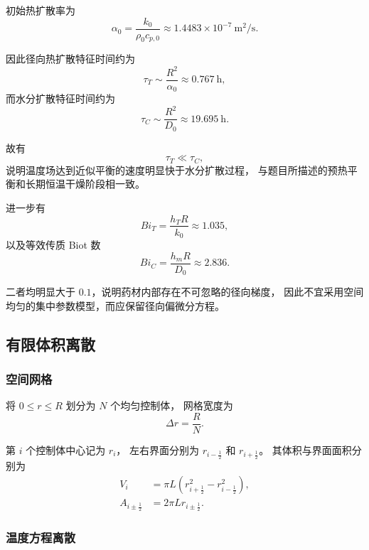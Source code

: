 \documentclass[UTF8,a4paper,12pt]{ctexart}
\begin{document}
初始热扩散率为
\begin{equation}
\alpha_0
=
\frac{k_0}{\rho_0c_{p,0}}
\approx1.4483\times10^{-7}~\mathrm{m^2/s}.
\end{equation}

因此径向热扩散特征时间约为
\begin{equation}
\tau_T
\sim
\frac{R^2}{\alpha_0}
\approx0.767~\mathrm{h},
\end{equation}
而水分扩散特征时间约为
\begin{equation}
\tau_C
\sim
\frac{R^2}{D_0}
\approx19.695~\mathrm{h}.
\end{equation}

故有
\begin{equation}
\tau_T\ll\tau_C,
\end{equation}
说明温度场达到近似平衡的速度明显快于水分扩散过程，
与题目所描述的预热平衡和长期恒温干燥阶段相一致。

进一步有
\begin{equation}
Bi_T=\frac{h_TR}{k_0}\approx1.035,
\end{equation}
以及等效传质 Biot 数
\begin{equation}
Bi_C=\frac{h_mR}{D_0}\approx2.836.
\end{equation}

二者均明显大于 $0.1$，说明药材内部存在不可忽略的径向梯度，
因此不宜采用空间均匀的集中参数模型，而应保留径向偏微分方程。

\subsection{有限体积离散}

\subsubsection{空间网格}

将 $0\le r\le R$ 划分为 $N$ 个均匀控制体，
网格宽度为
\begin{equation}
\Delta r=\frac{R}{N}.
\end{equation}

第 $i$ 个控制体中心记为 $r_i$，
左右界面分别为 $r_{i-\frac12}$ 和 $r_{i+\frac12}$。
其体积与界面面积分别为
\begin{align}
V_i
&=
\pi L
\left(
r_{i+\frac12}^2-r_{i-\frac12}^2
\right),\\
A_{i\pm\frac12}
&=
2\pi Lr_{i\pm\frac12}.
\end{align}

\subsubsection{温度方程离散}
\end{document}
